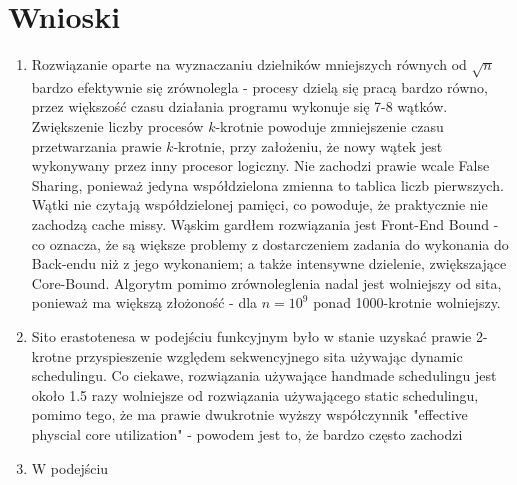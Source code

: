\documentclass[12pt]{article}
\begin{document}
\section{Wnioski}
\begin{enumerate}
	\item Rozwiązanie oparte na wyznaczaniu dzielników mniejszych równych od \(\sqrt{n}\) bardzo efektywnie się zrównolegla - procesy dzielą się pracą bardzo równo, przez większość czasu działania programu wykonuje się 7-8 wątków. Zwiększenie liczby procesów \(k\)-krotnie powoduje zmniejszenie czasu przetwarzania prawie \(k\)-krotnie, przy założeniu, że nowy wątek jest wykonywany przez inny procesor logiczny. Nie zachodzi prawie wcale False Sharing, ponieważ jedyna współdzielona zmienna to tablica liczb pierwszych. Wątki nie czytają współdzielonej pamięci, co powoduje, że praktycznie nie zachodzą cache missy. Wąskim gardłem rozwiązania jest Front-End Bound - co oznacza, że są większe problemy z dostarczeniem zadania do wykonania do Back-endu niż z jego wykonaniem; a także intensywne dzielenie, zwiększające Core-Bound. Algorytm pomimo zrównoleglenia nadal jest wolniejszy od sita, ponieważ ma większą złożoność - dla \(n=10^9\) ponad 1000-krotnie wolniejszy.
	\item Sito erastotenesa w podejściu funkcyjnym było w stanie uzyskać prawie 2-krotne przyspieszenie względem sekwencyjnego sita używając dynamic schedulingu. Co ciekawe, rozwiązania używające handmade schedulingu jest około 1.5 razy wolniejsze od rozwiązania używającego static schedulingu, pomimo tego, że ma prawie dwukrotnie wyższy współczynnik "effective physcial core utilization" - powodem jest to, że bardzo często zachodzi
	
	\item W podejściu 
\end{enumerate}
\end{document}
